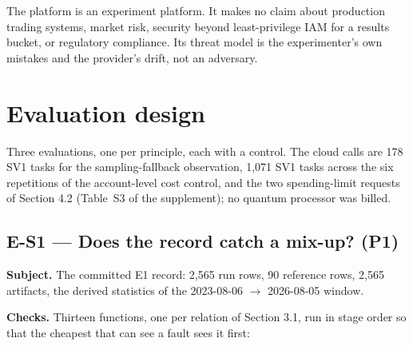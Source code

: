 \documentclass[acmsmall,screen,review]{acmart}
\begin{document}
The platform is an experiment platform. It makes no claim about production trading systems, market risk, security beyond least-privilege IAM for a results bucket, or regulatory compliance. Its threat model is the experimenter's own mistakes and the provider's drift, not an adversary.


\section{Evaluation design}

Three evaluations, one per principle, each with a control. The cloud calls are 178 SV1 tasks for the sampling-fallback observation, 1,071 SV1 tasks across the six repetitions of the account-level cost control, and the two spending-limit requests of Section 4.2 (Table~S3 of the supplement); no quantum processor was billed.


\subsection{E-S1 --- Does the record catch a mix-up? (P1)}

\textbf{Subject.} The committed E1 record: 2,565 run rows, 90 reference rows, 2,565 artifacts, the derived statistics of the 2023-08-06 $\rightarrow$ 2026-08-05 window.


\textbf{Checks.} Thirteen functions, one per relation of Section 3.1, run in stage order so that the cheapest that can see a fault sees it first:
\end{document}
